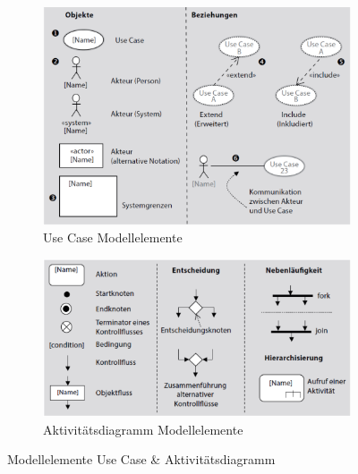 \documentclass[a4paper]{article}
\begin{document}
			\begin{figure}[!htb]
				\centering
				\begin{subfigure}{.45\textwidth}
					\centering
					\includegraphics[width=\textwidth]{img/re/03/usecase_elements.png}
					\caption{Use Case Modellelemente}
					\label{fig:re_usecase_elements}
				\end{subfigure}
				\begin{subfigure}{.45\textwidth}
					\centering
					\includegraphics[width=\textwidth]{img/re/03/activity_elements.png}
					\caption{Aktivitätsdiagramm Modellelemente}
					\label{fig:re_activity_elements}
				\end{subfigure}
				\caption{Modellelemente Use Case \& Aktivitätsdiagramm}
				\label{fig:re_elements_01}
			\end{figure}
		
\end{document}
